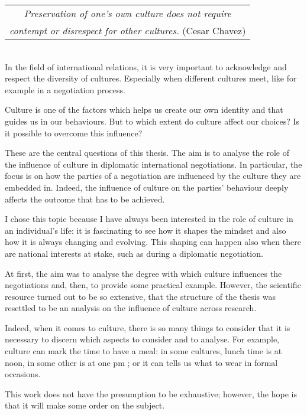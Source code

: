 \documentclass[../main.tex]{subfiles}
\begin{document}
  \begin{tabular}{c}
 \textit{Preservation of one's own culture does not require}\\
 \textit{contempt or disrespect for other cultures.} (Cesar Chavez)\\
  \end{tabular}\\


In the field of international relations, it is very important to acknowledge and respect the diversity of cultures. Especially when different cultures meet, like for example in a negotiation process.

Culture is one of the factors which helps us create our own identity and that guides us in our behaviours. But to which extent do culture affect our choices? Is it possible to overcome this influence?

These are the central questions of this thesis. The aim is to analyse the role of the influence of culture in diplomatic international negotiations. In particular, the focus is on how the parties of a negotiation are influenced by the culture they are embedded in. Indeed, the influence of culture on the parties' behaviour deeply affects the outcome that has to be achieved.

I chose this topic because I have always been interested in the role of culture in an individual's life: it is fascinating to see how it shapes the mindset and also how it is always changing and evolving. This shaping can happen also when there are national interests at stake, such as during a diplomatic negotiation.

At first, the aim was to analyse the degree with which culture influences the negotiations and, then, to provide some practical example. However, the scientific resource turned out to be so extensive, that the structure of the thesis was resettled to be an analysis on the influence of culture across research.

Indeed, when it comes to culture, there is so many things to consider that it is necessary to discern which aspects to consider and to analyse. For example, culture can mark the time to have a meal: in some cultures, lunch time is at noon, in some other is at one pm \autocite[7]{helen}; or it can tells us what to wear in formal occasions.

This work does not have the presumption to be exhaustive; however, the hope is that it will make some order on the subject.\\
\end{document}
